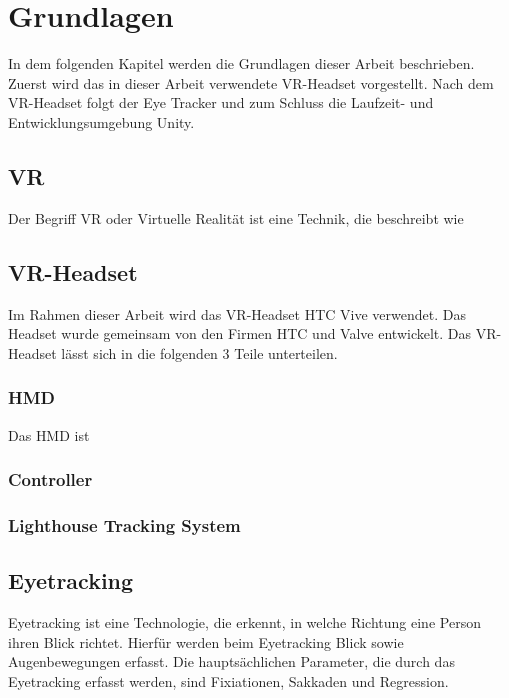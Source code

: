 
\chapter{Grundlagen}
In dem folgenden Kapitel werden die Grundlagen dieser Arbeit beschrieben. Zuerst wird das in dieser Arbeit verwendete \acs{VR}-Headset vorgestellt. Nach dem \acs{VR}-Headset folgt der Eye Tracker und zum Schluss die Laufzeit- und Entwicklungsumgebung Unity.

\section{\acl{VR}}
Der Begriff \ac{VR} oder Virtuelle Realität ist eine Technik, die beschreibt wie 

\section{\acs{VR}-Headset}
Im Rahmen dieser Arbeit wird das \acs{VR}-Headset HTC Vive verwendet. Das Headset wurde gemeinsam von den Firmen HTC und Valve entwickelt. Das \acs{VR}-Headset lässt sich in die folgenden 3 Teile unterteilen. 

\cite{Clay_Koenig_Koenig_2019}
\subsection{\acl{HMD}}
Das \ac{HMD} ist 

\subsection{Controller}

\subsection{Lighthouse Tracking System}

\section{Eyetracking}
Eyetracking ist eine Technologie, die erkennt, in welche Richtung eine Person ihren Blick richtet. Hierfür werden beim Eyetracking Blick sowie Augenbewegungen erfasst. Die hauptsächlichen Parameter, die durch das Eyetracking erfasst werden, sind Fixiationen, Sakkaden und Regression.


